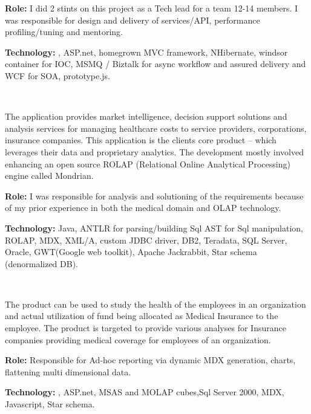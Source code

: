 \begin{resume}
\begin{position}
{\textbf{Role:}} I did 2 stints on this project as a Tech lead for a team 12-14 members. I was responsible for design and delivery of services/API, performance profiling/tuning and mentoring.

{\textbf{Technology:}} \CSharp, ASP.net, homegrown MVC framework, NHibernate,  windsor container for IOC, MSMQ / Biztalk for async workflow and assured delivery and WCF for SOA, prototype.js.
\end{position}\\

\begin{position}
The application provides market intelligence, decision support solutions and analysis services for managing healthcare costs to service providers, corporations, insurance companies. This application is the clients core product – which leverages their data and proprietary analytics. The 
development mostly involved enhancing an open source ROLAP (Relational Online Analytical Processing) engine called Mondrian. 

{\textbf{Role:}} I was responsible for analysis and solutioning of the requirements because of my prior experience in both the medical domain and OLAP technology. 

{\textbf{Technology:}} Java, ANTLR for parsing/building Sql AST for Sql manipulation, ROLAP, MDX, XML/A, custom JDBC driver, DB2, Teradata, SQL Server, Oracle, GWT(Google web toolkit), Apache Jackrabbit, Star schema (denormalized DB).
\end{position}\\

\begin{position}
The product can be used to study the health of the employees in an organization and actual utilization of fund being allocated as Medical Insurance to the employee. The product is targeted to provide various analyses for Insurance companies providing medical coverage for employees of an organization.

{\textbf{Role:}} Responsible for Ad-hoc reporting via dynamic MDX generation, charts, flattening multi dimensional data.

{\textbf{Technology:}} \CSharp, ASP.net, MSAS and MOLAP cubes,Sql Server 2000, MDX, Javascript, Star schema.
\end{position}\\


\end{resume}
